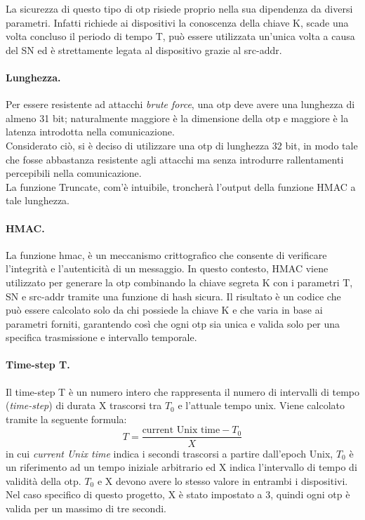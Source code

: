 La sicurezza di questo tipo di \gls{otp} risiede proprio nella sua dipendenza da diversi parametri. Infatti richiede ai dispositivi la conoscenza della chiave K, scade una volta concluso il periodo di tempo T, può essere utilizzata un'unica volta a causa del SN ed è strettamente legata al dispositivo grazie al src-addr.

\paragraph{Lunghezza.}
Per essere resistente ad attacchi \textit{brute force}, una \gls{otp} deve avere una lunghezza di almeno 31 bit; naturalmente maggiore è la dimensione della \gls{otp} e maggiore è la latenza introdotta nella comunicazione.\\
Considerato ciò, si è deciso di utilizzare una \gls{otp} di lunghezza 32 bit, in modo tale che fosse abbastanza resistente agli attacchi ma senza introdurre rallentamenti percepibili nella comunicazione.\\
La funzione Truncate, com'è intuibile, troncherà l'output della funzione HMAC a tale lunghezza.

\paragraph{HMAC.}
La funzione \gls{hmac}\glsfirstoccur, è un meccanismo crittografico che consente di verificare l'integrità e l'autenticità di un messaggio. In questo contesto, HMAC viene utilizzato per generare la \gls{otp} combinando la chiave segreta K con i parametri T, SN e src-addr tramite una funzione di hash sicura. Il risultato è un codice che può essere calcolato solo da chi possiede la chiave K e che varia in base ai parametri forniti, garantendo così che ogni \gls{otp} sia unica e valida solo per una specifica trasmissione e intervallo temporale.

\paragraph{Time-step T.}
Il time-step T è un numero intero che rappresenta il numero di intervalli di tempo (\textit{time-step}) di durata X trascorsi tra $T_0$ e l'attuale tempo unix. Viene calcolato tramite la seguente formula:
\begin{equation}
    T = \frac{\text{current Unix time} - T_0}{X}
    \label{eq:timestep}
\end{equation}
in cui \textit{current Unix time} indica i secondi trascorsi a partire dall'epoch Unix, $T_0$ è un riferimento ad un tempo iniziale arbitrario ed X indica l'intervallo di tempo di validità della \gls{otp}. $T_0$ e X devono avere lo stesso valore in entrambi i dispositivi.
Nel caso specifico di questo progetto, X è stato impostato a 3, quindi ogni \gls{otp} è valida per un massimo di tre secondi.

